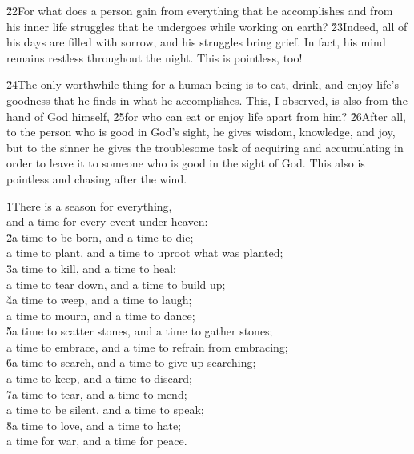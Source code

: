 \v{22}For what does a person gain from everything that he accomplishes and from his inner life struggles that he undergoes while working on earth? \v{23}Indeed, all of his days are filled with sorrow, and his struggles bring grief. In fact, his mind remains restless throughout the night. This is pointless, too!

\v{24}The only worthwhile thing for a human being is to eat, drink, and enjoy life's goodness that he finds in what he accomplishes. This, I observed, is also from the hand of God himself, \v{25}for who can eat or enjoy life apart from him? \v{26}After all, to the person who is good in God's sight, he gives wisdom, knowledge, and joy, but to the sinner he gives the troublesome task of acquiring and accumulating in order to leave it to someone who is good in the sight of God. This also is pointless and chasing after the wind.

\begin{poetry}
\poeml {}
\v{1}There is a season for everything, \\
\poeml and a time for every event under heaven: \\
\poeml \v{2}a time to be born, and a time to die; \\
\poemll    a time to plant, and a time to uproot what was planted; \\
\poeml \v{3}a time to kill, and a time to heal; \\
\poemll    a time to tear down, and a time to build up; \\
\poeml \v{4}a time to weep, and a time to laugh; \\
\poemll    a time to mourn, and a time to dance; \\
\poeml \v{5}a time to scatter stones, and a time to gather stones; \\
\poemll    a time to embrace, and a time to refrain from embracing; \\
\poeml \v{6}a time to search, and a time to give up searching; \\
\poemll    a time to keep, and a time to discard; \\
\poeml \v{7}a time to tear, and a time to mend; \\
\poemll    a time to be silent, and a time to speak; \\
\poeml \v{8}a time to love, and a time to hate; \\
\poemll    a time for war, and a time for peace.
\end{poetry}


